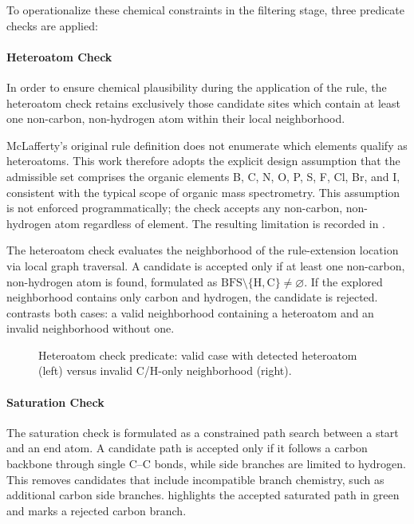 To operationalize these chemical constraints in the filtering stage, three predicate checks are applied:

\paragraph{Heteroatom Check}
\label{par:heteroatom-check}
In order to ensure chemical plausibility during the application of the rule, the heteroatom check retains exclusively those candidate sites which contain at least one non-carbon, non-hydrogen atom within their local neighborhood.

McLafferty's original rule definition \cite[p.~57]{McLafferty1993} does not enumerate which elements qualify as heteroatoms. This work therefore adopts the explicit design assumption that the admissible set comprises the organic elements B, C, N, O, P, S, F, Cl, Br, and I, consistent with the typical scope of organic mass spectrometry. This assumption is not enforced programmatically; the check accepts any non-carbon, non-hydrogen atom regardless of element. The resulting limitation is recorded in .

The heteroatom check evaluates the neighborhood of the rule-extension location via local graph traversal.
A candidate is accepted only if at least one non-carbon, non-hydrogen atom is found, formulated as $\mathrm{BFS}\setminus\{\mathrm{H},\mathrm{C}\}\neq\varnothing$.
If the explored neighborhood contains only carbon and hydrogen, the candidate is rejected.
 contrasts both cases: a valid neighborhood containing a heteroatom and an invalid neighborhood without one.

\begin{figure}[H]
    \centering
    
    \caption[Heteroatom check predicate]{
        Heteroatom check predicate: 
        valid case with detected heteroatom (left) versus invalid C/H-only neighborhood (right).
    }
    \label{fig:heteroatom-check}
\end{figure}

\paragraph{Saturation Check}
The saturation check is formulated as a constrained path search between a start and an end atom.
A candidate path is accepted only if it follows a carbon backbone through single C--C bonds, while side branches are limited to hydrogen.
This removes candidates that include incompatible branch chemistry, such as additional carbon side branches.
 highlights the accepted saturated path in green and marks a rejected carbon branch.


